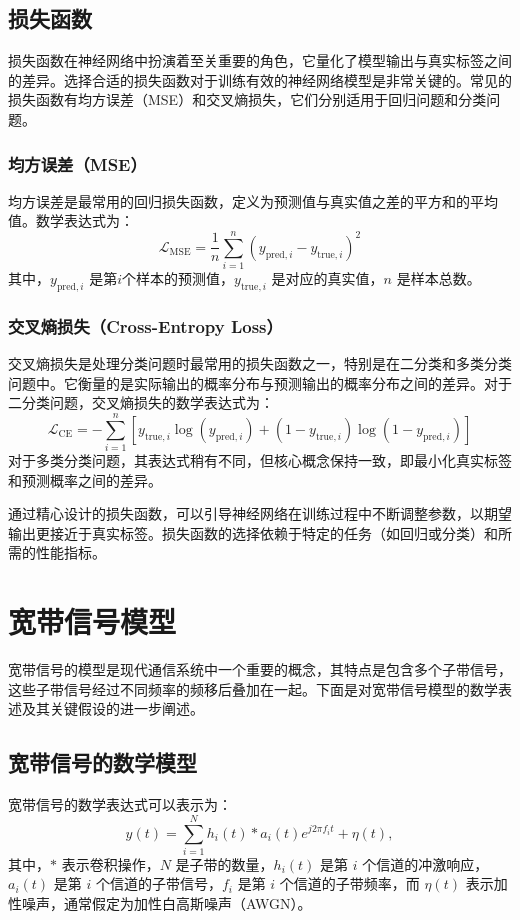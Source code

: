 \subsection{损失函数}\label{sec:background}
损失函数在神经网络中扮演着至关重要的角色，它量化了模型输出与真实标签之间的差异。选择合适的损失函数对于训练有效的神经网络模型是非常关键的。常见的损失函数有均方误差（MSE）和交叉熵损失，它们分别适用于回归问题和分类问题。

\subsubsection{均方误差（MSE）} 
均方误差是最常用的回归损失函数，定义为预测值与真实值之差的平方和的平均值。数学表达式为：
\begin{equation}
    \mathcal{L}_{\text{MSE}} = \frac{1}{n} \sum_{i=1}^{n} (y_{\text{pred}, i} - y_{\text{true}, i})^2
\end{equation}
其中，\(y_{\text{pred}, i}\) 是第\(i\)个样本的预测值，\(y_{\text{true}, i}\) 是对应的真实值，\(n\) 是样本总数。

\subsubsection{交叉熵损失（Cross-Entropy Loss）}
交叉熵损失是处理分类问题时最常用的损失函数之一，特别是在二分类和多类分类问题中。它衡量的是实际输出的概率分布与预测输出的概率分布之间的差异。对于二分类问题，交叉熵损失的数学表达式为：
\begin{equation}
    \mathcal{L}_{\text{CE}} = -\sum_{i=1}^{n} [y_{\text{true}, i} \log(y_{\text{pred}, i}) + (1 - y_{\text{true}, i}) \log(1 - y_{\text{pred}, i})]
\end{equation}
对于多类分类问题，其表达式稍有不同，但核心概念保持一致，即最小化真实标签和预测概率之间的差异。

通过精心设计的损失函数，可以引导神经网络在训练过程中不断调整参数，以期望输出更接近于真实标签。损失函数的选择依赖于特定的任务（如回归或分类）和所需的性能指标。


\section{宽带信号模型}\label{sec:background}


宽带信号的模型是现代通信系统中一个重要的概念，其特点是包含多个子带信号，这些子带信号经过不同频率的频移后叠加在一起。下面是对宽带信号模型的数学表述及其关键假设的进一步阐述。

\subsection{宽带信号的数学模型}\label{sec:background}
宽带信号的数学表达式可以表示为：
\begin{equation}
    y(t)=\sum_{i=1}^N h_i(t) \ast a_i(t)e^{j2\pi f_i t}+\eta(t),
\end{equation}
其中，\( \ast \) 表示卷积操作，\( N \) 是子带的数量，\( h_i(t) \) 是第 \( i \) 个信道的冲激响应，\( a_i(t) \) 是第 \( i \) 个信道的子带信号，\( f_i \) 是第 \( i \) 个信道的子带频率，而 \( \eta(t) \) 表示加性噪声，通常假定为加性白高斯噪声（AWGN）。

